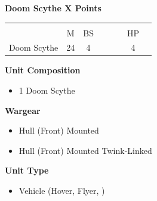 \subsubsection[Doom Scythe]{}
\hspace{0.5em}
\begin{minipage}[t]{0.72\textwidth}
	{\large \textbf{Doom Scythe \dotfill X Points}}
	\begin{NiceTabular}{m{145 pt} *{2}{c} | *{3}{c} | c | c }
		& & &  & & & &  \\
		& M & BS &  &  &  & HP &  \\
		\hline
		Doom Scythe & 24 & 4 &  &  &  & 4 & \\
	\end{NiceTabular}
	\small
	\begin{minipage}[t]{0.5\textwidth}
		\begin{flushleft}
			\vspace*{2em}
			\textbf{Unit Composition}
			\begin{itemize}
				\item 1 Doom Scythe
			\end{itemize}
			
			\textbf{Wargear}
			\begin{itemize}
				\item Hull (Front) Mounted 
				\item Hull (Front) Mounted Twink-Linked 
			\end{itemize}
		\end{flushleft}
	\end{minipage}
	\begin{minipage}[t]{0.5\textwidth}
		\begin{flushleft}
			\vspace*{2em}
			\textbf{Unit Type}
			\begin{itemize}
				\item Vehicle (Hover, Flyer, \quickref{Living Metal})
			\end{itemize}
			

\end{flushleft}
\end{minipage}
\end{minipage}
